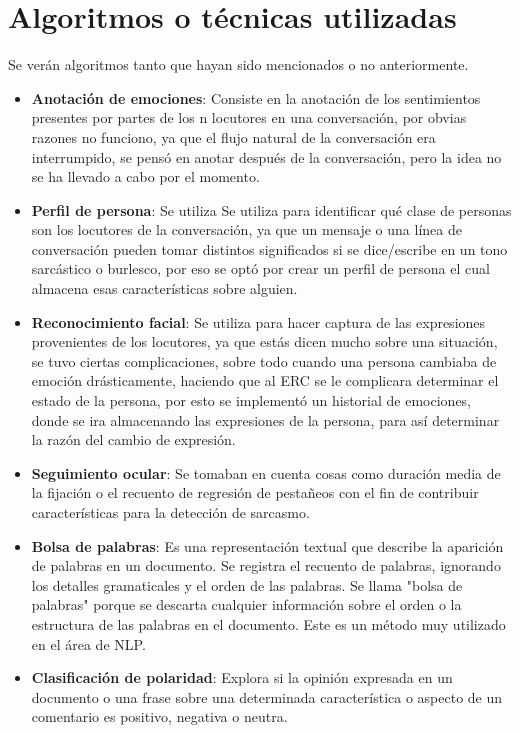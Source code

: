 \documentclass[conference]{IEEEtran}
\begin{document}
\section{Algoritmos o técnicas utilizadas}
Se verán algoritmos tanto que hayan sido mencionados o no anteriormente. 
\begin{itemize}
  \item \textbf{Anotación de emociones}: Consiste en la anotación de los sentimientos presentes por partes de los n locutores en una conversación, por obvias razones no funciono, ya que el flujo natural de la conversación era interrumpido, se pensó en anotar después de la conversación, pero la idea no se ha llevado a cabo por el momento.
  \item \textbf{Perfil de persona}: Se utiliza Se utiliza para identificar qué clase de personas son los locutores de la conversación, ya que un mensaje o una línea de conversación pueden tomar distintos significados si se dice/escribe en un tono sarcástico o burlesco, por eso se optó por crear un perfil de persona el cual almacena esas características sobre alguien. 
  \item \textbf{Reconocimiento facial}: Se utiliza para hacer captura de las expresiones provenientes de los locutores, ya que estás dicen mucho sobre una situación, se tuvo ciertas complicaciones, sobre todo cuando una persona cambiaba de emoción drásticamente, haciendo que al ERC se le complicara determinar el estado de la persona, por esto se implementó un historial de emociones, donde se ira almacenando las expresiones de la persona, para así determinar la razón del cambio de expresión.
  \item \textbf{Seguimiento ocular}: Se tomaban en cuenta cosas como duración media de la fijación o el recuento de regresión de pestañeos con el fin de contribuir características para la detección de sarcasmo. 
  \item \textbf{Bolsa de palabras}: Es una representación textual que describe la aparición de palabras en un documento. Se registra el recuento de palabras, ignorando los detalles gramaticales y el orden de las palabras. Se llama "bolsa de palabras" porque se descarta cualquier información sobre el orden o la estructura de las palabras en el documento. Este es un método muy utilizado en el área de NLP.
  \item \textbf{Clasificación de polaridad}: Explora si la opinión expresada en un documento o una frase sobre una determinada característica o aspecto de un comentario es positivo, negativa o neutra. 


\end{itemize}
\end{document}
